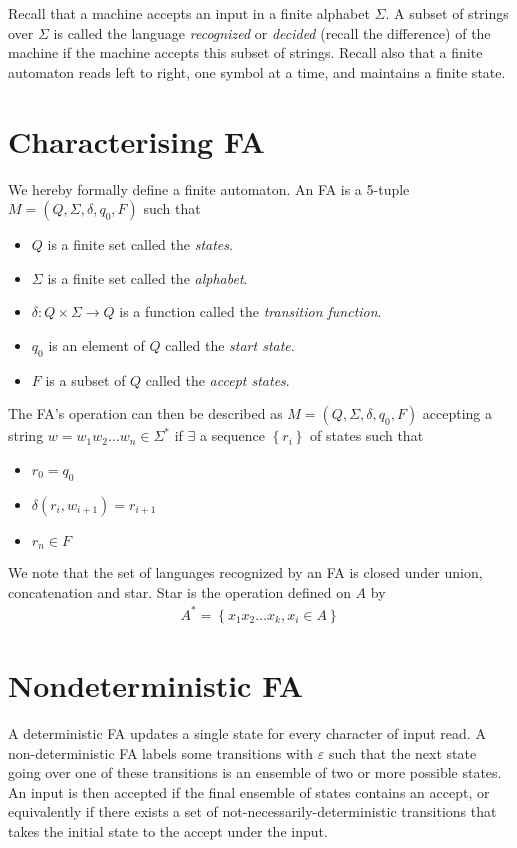 \documentclass[10pt]{report}
\begin{document}
Recall that a machine accepts an input in a finite alphabet $\Sigma$. A subset of strings over $\Sigma$ is called the language \emph{recognized} or \emph{decided} (recall the difference) of the machine if the machine accepts this subset of strings. Recall also that a finite automaton reads left to right, one symbol at a time, and maintains a finite state.

\section{Characterising FA}

We hereby formally define a finite automaton. An FA is a 5-tuple $M = (Q,\Sigma,\delta,q_0,F)$ such that
\begin{itemize}
    \item $Q$ is a finite set called the \emph{states}.
    \item $\Sigma$ is a finite set called the \emph{alphabet}.
    \item $\delta: Q \times \Sigma \to Q$ is a function called the \emph{transition function}.
    \item $q_0$ is an element of $Q$ called the \emph{start state}.
    \item $F$ is a subset of $Q$ called the \emph{accept states}.
\end{itemize}

The FA's operation can then be described as $M = (Q, \Sigma, \delta, q_0, F)$ accepting a string $w = w_1 w_2\dots w_n \in \Sigma^*$ if $\exists$ a sequence $\left\{ r_i \right\}$ of states such that
\begin{itemize}
    \item $r_0 = q_0$
    \item $\delta(r_i, w_{i+1}) = r_{i+1}$
    \item $r_n \in F$
\end{itemize}

We note that the set of languages recognized by an FA is closed under union, concatenation and star. Star is the operation defined on $A$ by
\begin{align}
    A^* = \left\{ x_1 x_2\dots x_k, x_i \in A \right\}
\end{align}

\section{Nondeterministic FA}

A deterministic FA updates a single state for every character of input read. A non-deterministic FA labels some transitions with $\varepsilon$ such that the next state going over one of these transitions is an ensemble of two or more possible states. An input is then accepted if the final ensemble of states contains an accept, or equivalently if there exists a set of not-necessarily-deterministic transitions that takes the initial state to the accept under the input.
\end{document}
